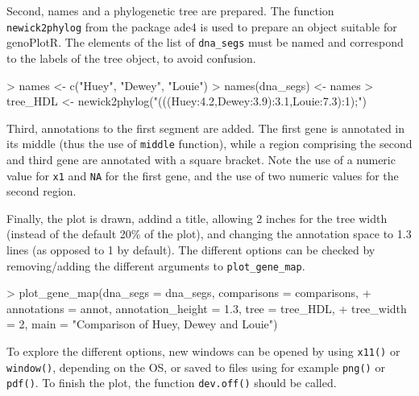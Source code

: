 \documentclass[a4paper]{article}
\newcommand{\code}[1]{\texttt{#1}}
\newcommand{\pkg}[1]{{\normalfont\fontseries{b}\selectfont #1}}
\newcommand{\genoPlotR}{\pkg{genoPlotR}}
\begin{document}
Second, names and a phylogenetic tree are prepared. The function 
\code{newick2phylog} from the package \pkg{ade4} is used to prepare an
object suitable for \genoPlotR{}. The elements of the list of 
\code{dna\_segs} must be named and correspond to the labels of the
tree object, to avoid confusion.

\begin{Schunk}
\begin{Sinput}
> names <- c("Huey", "Dewey", "Louie")
> names(dna_segs) <- names
> tree_HDL <- newick2phylog("(((Huey:4.2,Dewey:3.9):3.1,Louie:7.3):1);")
\end{Sinput}
\end{Schunk}

Third, annotations to the first segment are added. The first gene is annotated
in its middle (thus the use of \code{middle} function), while a region 
comprising the second and third gene are annotated with a square bracket.
Note the use of a numeric value for \code{x1} and \code{NA} for the first
gene, and the use of two numeric values for the second region.

\begin{Schunk}
\end{Schunk}

Finally, the plot is drawn, addind a title, allowing 2 inches for the tree
width (instead of the default 20\% of the plot), and changing the annotation
space to 1.3 lines (as opposed to 1 by default). The different options can be
checked by removing/adding the different arguments to \code{plot\_gene\_map}. 

\begin{Schunk}
\begin{Sinput}
> plot_gene_map(dna_segs = dna_segs, comparisons = comparisons, 
+     annotations = annot, annotation_height = 1.3, tree = tree_HDL, 
+     tree_width = 2, main = "Comparison of Huey, Dewey and Louie")
\end{Sinput}
\end{Schunk}

To explore the different options, new windows can be opened by using 
\code{x11()} or \code{window()}, depending on the OS, or saved to files 
using for example \code{png()} or \code{pdf()}. To finish the plot, the 
function \code{dev.off()} should be called.
\end{document}
